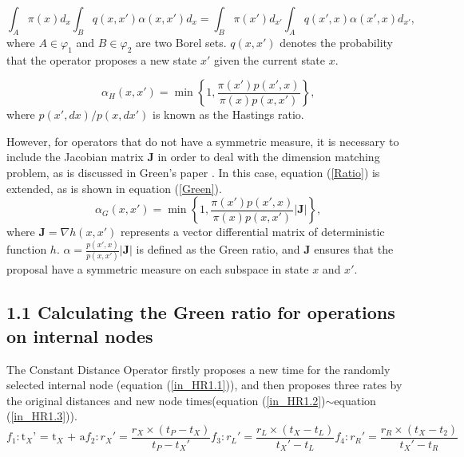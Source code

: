 \documentclass{bmcart}
\begin{document}
\begin{backmatter}
\begin{equation}\label{balance}
\int_A {\pi (x) d_x} {\int_B  {q(x, x')}{\alpha(x, x')} d_x}  = \int_B {\pi (x') d_{x'}}{\int_A {q(x', x)}{\alpha(x', x)} d_{x'}} \text{,}
\end{equation}
where $A \in {\varphi_1}$ and $B \in  {\varphi_2}$ are two Borel sets. ${q(x, x')}$ denotes the probability that the operator proposes a new state $x'$ given the current state $x$.

\begin{equation}\label{Ratio}
{\alpha_H}(x, x') = \min \left\{ {1,\frac{{\pi (x'){p}(x',x)}}{{\pi (x){p}(x,x')}}} \right\} \text{,}
\end{equation}
where ${p(x',dx)}/{p(x,dx')}$ is known as the Hastings ratio.

However, for operators that do not have a symmetric measure, it is necessary to include the Jacobian matrix ${\mathbf{J}}$  in order to deal with the dimension matching problem, as is discussed in Green's paper \cite{green1995reversible}. In this case, equation (\ref{Ratio}) is extended, as is shown in equation (\ref{Green}).
\begin{equation}\label{Green}
{\alpha_G}(x, x') = \min \left\{ {1,\frac{{\pi (x'){p}(x',x)}}{{\pi (x){p}(x,x')}}}\left|{\mathbf{J}}\right| \right\} \text{,}
\end{equation}
where ${\mathbf{J}} = {\nabla h(x, x')}$ represents a vector differential matrix of deterministic function $h$. $\alpha = \frac{{p}(x',x)}{{p}(x,x')}\left|{\mathbf{J}}\right|$ is defined as the Green ratio, and ${\mathbf{J}}$ ensures that the proposal have a symmetric measure on each subspace in state $x$ and $x'$.

\subsection*{1.1 Calculating the Green ratio for operations on internal nodes}

The Constant Distance Operator firstly proposes a new time for the randomly selected internal node (equation (\ref{in_HR1.1})), and then proposes three rates by the original distances and new node times(equation (\ref{in_HR1.2})$\sim$equation (\ref{in_HR1.3})).
\begin{subequations}\label{in_HR1}
\begin{equation}\label{in_HR1.1}
{f_1}:{{\text{t}}_X}{\text{'  =  }}{{\text{t}}_X}{\text{  +  a}}
\end{equation}
\begin{equation}\label{in_HR1.2}
{f_2}:{r_X}' = \frac{{{r_X} \times ({t_P} - {t_X})}}{{{t_P} - {t_X}'}}
\end{equation}
\begin{equation}
{f_3}:{r_L}' = \frac{{{r_L} \times ({t_X} - {t_L})}}{{{t_X}' - {t_L}}}
\end{equation}
\begin{equation}\label{in_HR1.3}
{f_4}:{r_R}' = \frac{{{r_R} \times ({t_X} - {t_2})}}{{{t_X}' - {t_R}}}
\end{equation}
\end{subequations}


\end{backmatter}
\end{document}
